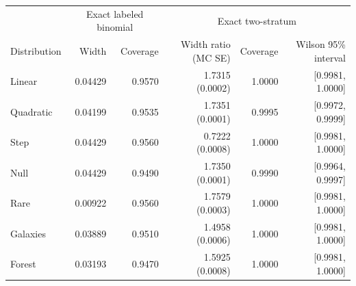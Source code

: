 \begin{tabular}{lrrrrr}
\toprule
 & \multicolumn{2}{c}{Exact labeled binomial} & \multicolumn{3}{c}{Exact two-stratum} \\
Distribution & Width & Coverage & Width ratio (MC SE) & Coverage & Wilson 95\% interval \\
\midrule
Linear & 0.04429 & 0.9570 & 1.7315 (0.0002) & 1.0000 & [0.9981, 1.0000] \\
Quadratic & 0.04199 & 0.9535 & 1.7351 (0.0001) & 0.9995 & [0.9972, 0.9999] \\
Step & 0.04429 & 0.9560 & 0.7222 (0.0008) & 1.0000 & [0.9981, 1.0000] \\
Null & 0.04429 & 0.9490 & 1.7350 (0.0001) & 0.9990 & [0.9964, 0.9997] \\
Rare & 0.00922 & 0.9560 & 1.7579 (0.0003) & 1.0000 & [0.9981, 1.0000] \\
Galaxies & 0.03889 & 0.9510 & 1.4958 (0.0006) & 1.0000 & [0.9981, 1.0000] \\
Forest & 0.03193 & 0.9470 & 1.5925 (0.0008) & 1.0000 & [0.9981, 1.0000] \\
\bottomrule
\end{tabular}
